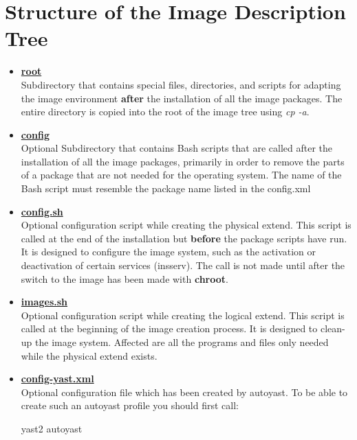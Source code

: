 \section{Structure of the Image Description Tree}
\label{imagetree}
\begin{itemize}

\item \textbf{\underline{root}}\\
      Subdirectory that contains special files, directories, and scripts for
      adapting the image environment \textbf{after} the installation of all the
      image packages. The entire directory is copied into the root of the
      image tree using \textit{cp -a}.
\item \textbf{\underline{config}}\\
      Optional Subdirectory that contains Bash scripts that are called
      after the installation of all the image packages, primarily in order
      to remove the parts of a package that are not needed for the operating
      system. The name of the Bash script must resemble the package name
      listed in the config.xml
\item \textbf{\underline{config.sh}}\\
      Optional configuration script while creating the physical extend. This
      script is called at the end of the installation but \textbf{before}
      the package scripts have run. It is designed to configure the image
      system, such as the activation or deactivation of certain services
      (insserv). The call is not made until after the switch to the image
      has been made with \textbf{chroot}.
\item \textbf{\underline{images.sh}}\\
      Optional configuration script while creating the logical extend.
      This script is called at the beginning of the image creation process.
      It is designed to clean-up the image system. Affected are all the
      programs and files only needed while the physical extend exists.
\item \textbf{\underline{config-yast.xml}}\\
      Optional configuration file which has been created by autoyast.
      To be able to create such an autoyast profile you should first
      call:

      \begin{Command}{8cm}
      yast2 autoyast
      \end{Command}


\end{itemize}
